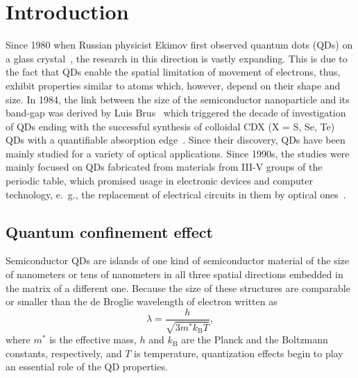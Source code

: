 \documentclass[
a4paper, %
11pt, %
onecolumn, %
openany, %
oldfontcommands,
]{memoir}
\begin{document}
\newpage
\cleardoublepage


\pagestyle{standard}

\tableofcontents*


\clearpage



\chapter{Introduction}\label{chap:introduction}


Since 1980 when Russian physicist Ekimov first observed quantum dots (QDs) on a glass crystal~\cite{Ekimov}, the research in this direction is vastly expanding. This is due to the fact that QDs enable the spatial limitation of movement of electrons, thus, exhibit properties similar to atoms which, however, depend on their shape and size. In 1984, the link between the size of the semiconductor nanoparticle and its band-gap was derived by Luis Brus~\cite{Brus} which triggered the decade of investigation of QDs ending with the successful synthesis of colloidal CDX (X = S, Se, Te) QDs with a quantifiable absorption edge~\cite{Murray}. Since their discovery, QDs have been mainly studied for a variety of optical applications. Since 1990s, the studies were mainly focused on QDs fabricated from materials from III-V groups of the periodic table, which promised usage in electronic devices and computer technology, e.~g., the replacement of electrical circuits in them by optical ones~\cite{Bimberg}. %

\section{Quantum confinement effect}
Semiconductor QDs are islands of one kind of semiconductor material of the size of nanometers or tens of nanometers in all three spatial directions embedded in the matrix of a different one. Because the size of these structures are comparable or smaller than the de Broglie wavelength of electron written as
\begin{equation}
\lambda=\frac{h}{\sqrt{3m^*k_\mathrm{B}T}},
\end{equation}
where $m^*$ is the effective mass, $h$ and $k_\mathrm{B}$ are the Planck and the Boltzmann constants, respectively, and $T$ is temperature, quantization effects begin to play an essential role of the QD properties.
\end{document}
